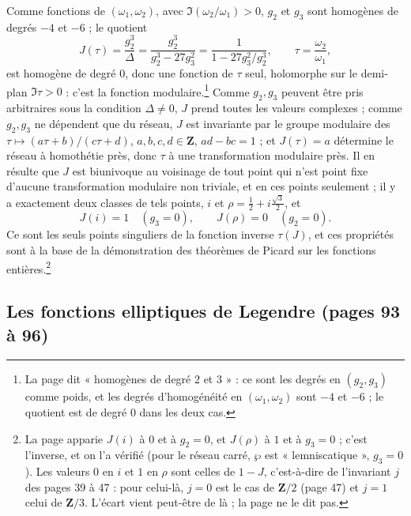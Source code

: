 \documentclass[11pt,a4paper]{article}
\begin{document}
Comme fonctions de $(\omega_1,
\omega_2)$, avec $\Im(\omega_2/\omega_1) > 0$, $g_2$ et $g_3$ sont homogènes de
degrés $-4$ et $-6$ ; le quotient
\[
J(\tau) = \frac{g_2^3}{\Delta} = \frac{g_2^3}{g_2^3 - 27g_3^2} =
\frac{1}{1 - 27g_3^2/g_2^3}, \qquad \tau = \frac{\omega_2}{\omega_1},
\]
est homogène de degré $0$, donc une fonction de $\tau$ seul, holomorphe sur le
demi-plan $\Im\tau > 0$ : c'est la fonction modulaire.\footnote{La page dit
« homogènes de degré $2$ et $3$ » : ce sont les degrés en $(g_2, g_3)$ comme
poids, et les degrés d'homogénéité en $(\omega_1, \omega_2)$ sont $-4$ et
$-6$ ; le quotient est de degré $0$ dans les deux cas.} Comme $g_2, g_3$ peuvent
être pris arbitraires sous la condition $\Delta \neq 0$, $J$ prend toutes les
valeurs complexes ; comme $g_2, g_3$ ne dépendent que du réseau, $J$ est
invariante par le groupe modulaire des $\tau \mapsto (a\tau + b)/(c\tau + d)$,
$a, b, c, d \in \mathbf{Z}$, $ad - bc = 1$ ; et $J(\tau) = a$ détermine le réseau
à homothétie près, donc $\tau$ à une transformation modulaire près. Il en
résulte que $J$ est biunivoque au voisinage de tout point qui n'est point fixe
d'aucune transformation modulaire non triviale, et en ces points seulement ; il
y a exactement deux classes de tels points, $i$ et $\rho = \frac12 +
i\frac{\sqrt3}{2}$, et
\[
J(i) = 1 \quad (g_3 = 0), \qquad J(\rho) = 0 \quad (g_2 = 0) .
\]
Ce sont les seuls points singuliers de la fonction inverse $\tau(J)$, et ces
propriétés sont à la base de la démonstration des théorèmes de Picard sur les
fonctions entières.\footnote{La page apparie $J(i)$ à $0$ et à $g_2 = 0$, et
$J(\rho)$ à $1$ et à $g_3 = 0$ ; c'est l'inverse, et on l'a vérifié (pour le réseau
carré, $\wp$ est « lemniscatique », $g_3 = 0$). Les valeurs $0$ en $i$ et $1$ en
$\rho$ sont celles de $1 - J$, c'est-à-dire de l'invariant $j$ des pages 39 à
47 : pour celui-là, $j = 0$ est le cas de $\mathbf{Z}/2$ (page 47) et $j = 1$ celui de
$\mathbf{Z}/3$. L'écart vient peut-être de là ; la page ne le dit pas.}

\subsection*{Les fonctions elliptiques de Legendre (pages 93 à 96)}
\end{document}
